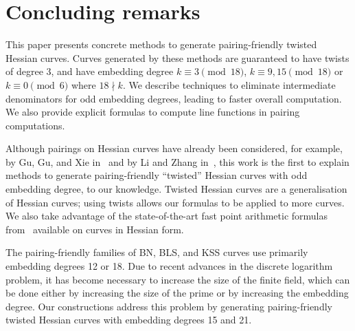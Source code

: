 \section{Concluding remarks}
\label{sec:conclude}


This paper presents concrete methods to generate pairing-friendly twisted Hessian curves.
Curves generated by these methods are guaranteed to have twists of degree $3$, and
have embedding degree
$k \equiv 3 \pmod{18}$,
$k \equiv 9,15 \pmod{18}$ or
$k \equiv 0 \pmod{6}$ where $18 \nmid k$.
We describe techniques to eliminate intermediate denominators for odd embedding degrees, leading to faster overall computation.
We also provide explicit formulas to compute line functions in pairing computations.

Although pairings on Hessian curves have already been considered,
for example, by Gu, Gu, and Xie in~\cite{2010/Gu} and by Li and Zhang in~\cite{2012/Li},
this work is the first to explain methods to generate pairing-friendly ``twisted'' Hessian curves with odd embedding degree, to our knowledge. Twisted Hessian curves are a generalisation of Hessian curves; using twists allows our formulas to be applied to more curves. We also take advantage of the state-of-the-art fast point arithmetic formulas from~\cite{2015/hessian} available on curves in Hessian form.

The pairing-friendly families of BN, BLS, and KSS curves use primarily embedding degrees 12 or 18. Due to recent advances in the discrete logarithm problem, it has become necessary to increase the size of the finite field, which can be done either by increasing the size of the prime or by increasing the embedding degree. Our constructions address this problem by generating pairing-friendly twisted Hessian curves with embedding degrees 15 and 21.

